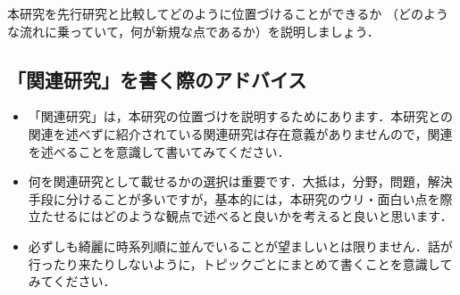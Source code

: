 本研究を先行研究と比較してどのように位置づけることができるか
（どのような流れに乗っていて，何が新規な点であるか）を説明しましょう．

\subsection*{「関連研究」を書く際のアドバイス}
\begin{itemize}
    \item 「関連研究」は，本研究の位置づけを説明するためにあります．本研究との関連を述べずに紹介されている関連研究は存在意義がありませんので，関連を述べることを意識して書いてみてください．
    \item 何を関連研究として載せるかの選択は重要です．大抵は，分野，問題，解決手段に分けることが多いですが，基本的には，本研究のウリ・面白い点を際立たせるにはどのような観点で述べると良いかを考えると良いと思います．
    \item 必ずしも綺麗に時系列順に並んでいることが望ましいとは限りません．話が行ったり来たりしないように，トピックごとにまとめて書くことを意識してみてください．
\end{itemize}